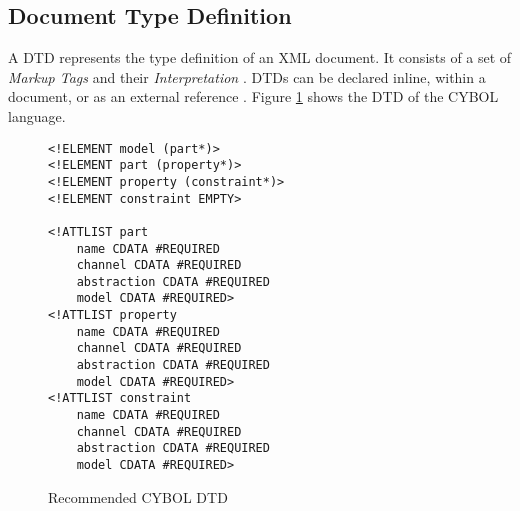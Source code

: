 %
%
%
%
%
%

\subsection{Document Type Definition}
\label{document_type_definition_heading}

A DTD represents the type definition of an XML document. It consists of a set
of \emph{Markup Tags} and their \emph{Interpretation} \cite{foldoc}. DTDs can
be declared inline, within a document, or as an external reference
\cite{w3schools}. Figure \ref{dtd_figure} shows the DTD of the CYBOL language.

\begin{figure}[ht]
    \bigskip
    \begin{scriptsize}
        \begin{verbatim}
<!ELEMENT model (part*)>
<!ELEMENT part (property*)>
<!ELEMENT property (constraint*)>
<!ELEMENT constraint EMPTY>

<!ATTLIST part
    name CDATA #REQUIRED
    channel CDATA #REQUIRED
    abstraction CDATA #REQUIRED
    model CDATA #REQUIRED>
<!ATTLIST property
    name CDATA #REQUIRED
    channel CDATA #REQUIRED
    abstraction CDATA #REQUIRED
    model CDATA #REQUIRED>
<!ATTLIST constraint
    name CDATA #REQUIRED
    channel CDATA #REQUIRED
    abstraction CDATA #REQUIRED
    model CDATA #REQUIRED>
        \end{verbatim}
    \end{scriptsize}
    \caption{Recommended CYBOL DTD}
    \label{dtd_figure}
\end{figure}


